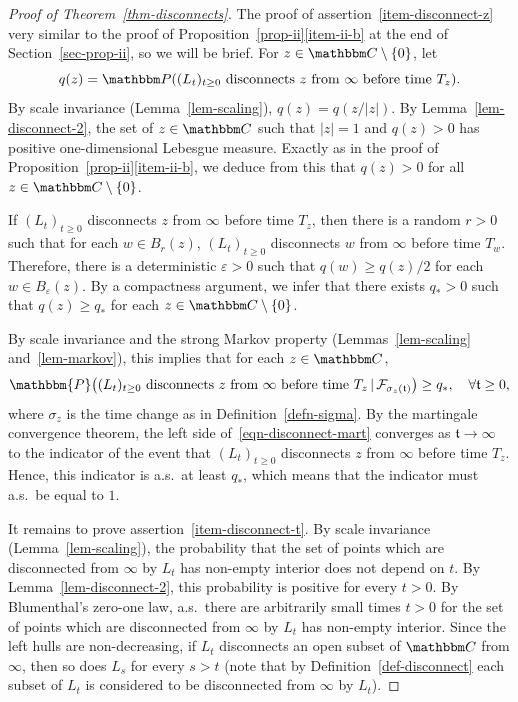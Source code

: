 \documentclass[11pt]{article}
\theoremstyle{plain}
\theoremstyle{definition}
\numberwithin{equation}{section}
\newcommand{\eqb}{\begin{equation}}
\newcommand{\eqe}{\end{equation}}
\newcommand{\eqbn}{\begin{equation*}}
\newcommand{\eqen}{\end{equation*}}
\newcommand{\BB}{\mathbbm}
\newcommand{\ep}{\varepsilon}
\newcommand{\rta}{\rightarrow}
\newcommand{\mcl}{\mathcal}
\newcommand{\tz}{{\mathfrak t}}
\let\originalleft\left
\let\originalright\right
\renewcommand{\left}{\mathopen{}\mathclose\bgroup\originalleft}
\renewcommand{\right}{\aftergroup\egroup\originalright}
\begin{document}
\begin{proof}[Proof of Theorem~\ref{thm-disconnects}]
The proof of assertion~\ref{item-disconnect-z} very similar to the proof of Proposition~{\hyperref[item-ii-b]{\ref*{prop-ii}\ref*{item-ii-b}}} at the end of Section~\ref{sec-prop-ii}, so we will be brief. 
For $z \in \BB C\setminus \{0\}$, let 
\eqbn
q(z) = \BB P\left( \text{$(L_t)_{t\geq 0}$ disconnects $z$ from $\infty$ before time $T_z$} \right) .
\eqen
By scale invariance (Lemma~\ref{lem-scaling}), $q(z) = q( z/|z|) $. 
By Lemma~\ref{lem-disconnect-2}, the set of $z\in\BB C$ such that $|z|=1$ and $q(z) > 0$ has positive one-dimensional Lebesgue measure. 
Exactly as in the proof of Proposition~{\hyperref[item-ii-b]{\ref*{prop-ii}\ref*{item-ii-b}}}, we deduce from this that $q(z) > 0$ for all $z\in\BB C\setminus\{0\}$.

If $(L_t)_{t\geq 0}$ disconnects $z$ from $\infty$ before time $T_z$, then there is a random $r > 0$ such that for each $w\in B_r(z)$, $(L_t)_{t\geq 0}$ disconnects $w$ from $\infty$ before time $T_w$. Therefore, there is a deterministic $\ep > 0$ such that $q(w) \geq q(z)/2$ for each $w\in B_\ep(z)$. 
By a compactness argument, we infer that there exists $q_* > 0$ such that $q(z) \geq q_*$ for each $z\in\BB C\setminus \{0\}$. 
 
By scale invariance and the strong Markov property (Lemmas~\ref{lem-scaling} and~\ref{lem-markov}), this implies that for each $z\in\BB C$, 
\eqb \label{eqn-disconnect-mart}
\BB{P}\left(    \text{$(L_t)_{t\geq 0}$ disconnects $z$ from $\infty$ before time $T_z$}    \,|\, \mcl F_{\sigma_z(\tz)} \right) \geq q_*   ,\quad \forall \tz \geq 0  ,
\eqe 
where $\sigma_z $ is the time change as in Definition~\ref{defn-sigma}. 
By the martingale convergence theorem, the left side of~\eqref{eqn-disconnect-mart} converges as $\tz\rta\infty$ to the indicator of the event that $(L_t)_{t\geq 0}$ disconnects $z$ from $\infty$ before time $T_z$. Hence, this indicator is a.s.\ at least $q_*$, which means that the indicator must a.s.\ be equal to $1$.  


It remains to prove assertion~\ref{item-disconnect-t}. 
By scale invariance (Lemma~\ref{lem-scaling}), the probability that the set of points which are disconnected from $\infty$ by $L_t$ has non-empty interior does not depend on $t$. 
By Lemma~\ref{lem-disconnect-2}, this probability is positive for every $t>0$. 
By Blumenthal's zero-one law, a.s.\ there are arbitrarily small times $t>0$ for the set of points which are disconnected from $\infty$ by $L_t$ has non-empty interior.
Since the left hulls are non-decreasing, if $L_t$ disconnects an open subset of $\BB C$ from $\infty$, then so does $L_s$ for every $s > t$ (note that by Definition~\ref{def-disconnect} each subset of $L_t$ is considered to be disconnected from $\infty$ by $L_t$).  
\end{proof}
\end{document}
